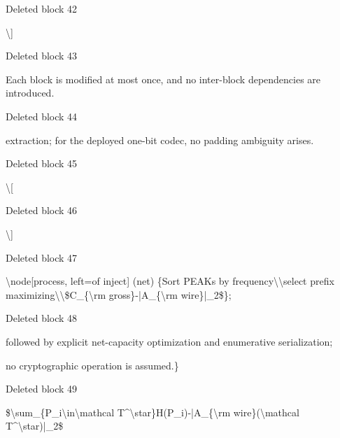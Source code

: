 \documentclass[a4paper,fleqn]{cas-dc}
\newenvironment{RevisionDeletion}{%
  \par\begingroup\color{revisionred}\footnotesize\ttfamily
  \setlength{\parindent}{0pt}\setlength{\parskip}{1pt}\obeyspaces
}{\par\endgroup}
\begin{document}
\begin{RevisionDeletion}
Deleted block 42\par
\textbackslash{}]\par
\end{RevisionDeletion}

\begin{RevisionDeletion}
Deleted block 43\par
Each block is modified at most once, and no inter-block dependencies are introduced.\par
\end{RevisionDeletion}

\begin{RevisionDeletion}
Deleted block 44\par
extraction; for the deployed one-bit codec, no padding ambiguity arises.\par
\end{RevisionDeletion}

\begin{RevisionDeletion}
Deleted block 45\par
\textbackslash{}[\par
\end{RevisionDeletion}

\begin{RevisionDeletion}
Deleted block 46\par
\textbackslash{}]\par
\end{RevisionDeletion}

\begin{RevisionDeletion}
Deleted block 47\par
\textbackslash{}node[process, left=of inject] (net) \{Sort PEAKs by frequency\textbackslash{}\textbackslash{}select prefix maximizing\textbackslash{}\textbackslash{}\$C\_\{\textbackslash{}rm gross\}-|A\_\{\textbackslash{}rm wire\}|\_2\$\};\par
\end{RevisionDeletion}

\begin{RevisionDeletion}
Deleted block 48\par
followed by explicit net-capacity optimization and enumerative serialization;\par
no cryptographic operation is assumed.\}\par
\end{RevisionDeletion}

\begin{RevisionDeletion}
Deleted block 49\par
\$\textbackslash{}sum\_\{P\_i\textbackslash{}in\textbackslash{}mathcal T\textasciicircum{}\textbackslash{}star\}H(P\_i)-|A\_\{\textbackslash{}rm wire\}(\textbackslash{}mathcal T\textasciicircum{}\textbackslash{}star)|\_2\$\par
\end{RevisionDeletion}
\end{document}

